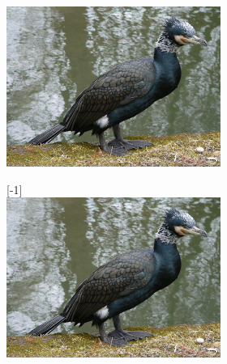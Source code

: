 \documentclass{article}
\begin{document}
\begin{figure}
\caption{Figure}
\label{figure}
\begin{figure}

\begin{subfigure}{4cm}
\label{subfig1}
\includegraphics[scale=0.1]{forraskepek/kep1.jpg}
\end{subfigure}

\lipsum[6]

\begin{subfigure}{4cm}
\label{subfig2}
\scalebox{1}[-1]{\includegraphics[scale=0.1]{forraskepek/kep1.jpg}}
\end{subfigure}
\end{figure}
\lipsum[1-3]
\end{figure}
\end{document}
